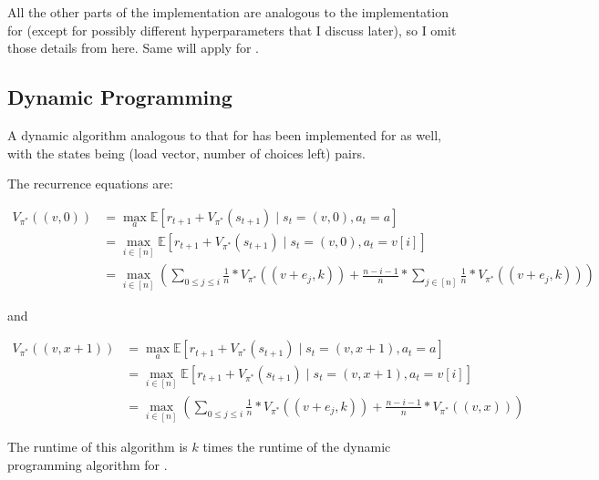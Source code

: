 All the other parts of the implementation are analogous to the implementation for \TwoThinning (except for possibly different hyperparameters that I discuss later), so I omit those details from here. Same will apply for \GraphicalTwoChoice.



\subsection{Dynamic Programming}


A dynamic algorithm analogous to that for \TwoThinning has been implemented for \KThinning as well, with the states being (load vector, number of choices left) pairs.


The recurrence equations are: 

\begin{equation} \label{eq:kthinning-dynamicprogramming-0left}
\begin{split}
    V_{\pi^*}((v, 0)) &= \max_a \mathbb{E} [r_{t+1} + V_{\pi^*}(s_{t+1}) \mid s_t=(v,0), a_t=a] \\
    &= \max_{i \in [n]} \mathbb{E} [r_{t+1} + V_{\pi^*}(s_{t+1}) \mid s_t=(v,0), a_t=v[i]] \\
    &= \max_{i \in [n]} (\sum_{0\leq j \leq i} \frac{1}{n}*V_{\pi^*}((v+e_j,k)) + \frac{n-i-1}{n} * \sum_{j \in [n]} \frac{1}{n}*V_{\pi^*}((v+e_j,k)))
\end{split}
\end{equation}

and 

\begin{equation} \label{eq:kthinning-dynamicprogramming-xleft}
\begin{split}
    V_{\pi^*}((v, x+1)) &= \max_a \mathbb{E} [r_{t+1} + V_{\pi^*}(s_{t+1}) \mid s_t=(v,x+1), a_t=a] \\
    &= \max_{i \in [n]} \mathbb{E} [r_{t+1} + V_{\pi^*}(s_{t+1}) \mid s_t=(v, x+1), a_t=v[i]] \\
    &= \max_{i \in [n]} (\sum_{0\leq j \leq i} \frac{1}{n}*V_{\pi^*}((v+e_j,k)) + \frac{n-i-1}{n} * V_{\pi^*}((v, x)))
\end{split}
\end{equation}

The runtime of this algorithm is $k$ times the runtime of the dynamic programming algorithm for \TwoThinning.



